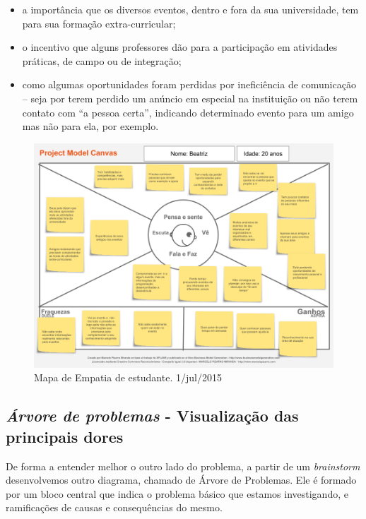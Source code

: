 \documentclass[12pt,a4paper,twoside,hyphens,english,brazil]{abntex2}
\newcommand{\conf}{{\color{OliveGreen}\framebox[1.1\width]{CNF}}}
\begin{document}
\begin{itemize}[itemsep=-1ex]
	\item  a importância que os diversos eventos, dentro e fora da sua universidade, tem para sua formação extra-curricular;
	\item  o incentivo que alguns professores dão para a participação em atividades práticas, de campo ou de integração;
	\item  como algumas oportunidades foram perdidas por ineficiência de comunicação -- seja por terem perdido um anúncio em especial na instituição ou não terem contato com ``a pessoa certa'', indicando determinado evento para um amigo mas não para ela, por exemplo.
\end{itemize}

\begin{figure}[!h]
	\centering
	\includegraphics[width=1\linewidth]{diagramas/mapa-de-empatia.png}
	\caption{Mapa de Empatia de estudante. 1/jul/2015}
	\label{diag:empatia}
\end{figure}


\subsection{\emph{Árvore de problemas} - Visualização das principais dores}
De forma a entender melhor o outro lado do problema, a partir de um \emph{brainstorm} desenvolvemos outro diagrama, chamado de Árvore de Problemas. Ele é formado por um bloco central que indica o problema básico que estamos investigando, e ramificações de causas e consequências do mesmo.\cite{arvore-de-problemas-portal-educacao}
\end{document}
